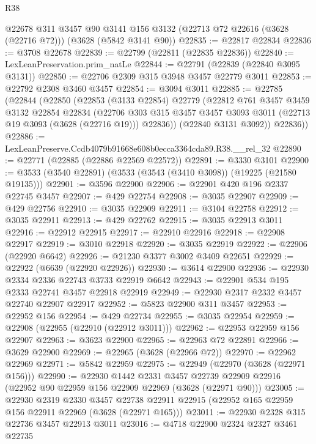 \begin{lexlean}{R38}
\begin{coremodule}
    @22678
    @311
    @3457
    @90
    @3141
    @156
    @3132
    (@22713 @72 @22616 (@3628 (@22716 @72)))
    (@3628 (@5842 @3141 @90))
@22835 := @22817 @22834
@22836 := @3708 @22678
@22839 := @22799 (@22811 (@22835 @22836))
@22840 := LexLeanPreservation.prim_natLe
@22844 := @22791 (@22839 (@22840 @3095 @3131))
@22850 := @22706 @2309 @315 @3948 @3457 @22779 @3011
@22853 := @22792 @2308 @3460 @3457
@22854 := @3094 @3011
@22885 := @22785
    (@22844
      (@22850
        (@22853
          (@3133 @22854)
          @22779
          (@22812
            @761
            @3457
            @3459
            @3132
            @22854
            @22834
            (@22706
              @303
              @315
              @3457
              @3457
              @3093
              @3011
              (@22713 @19 @3093 (@3628 (@22716 @19)))
              @22836))
          (@22840 @3131 @3092))
        @22836))
@22886 := LexLeanPreserve.Ccdb4079b91668e608b0ecca3364cda89.R38.__rel_32
@22890 := @22771 (@22885 (@22886 @22569 @22572))
@22891 := @3330 @3101
@22900 := @3533 (@3540 @22891) (@3533 (@3543 (@3410 @3098)) (@19225 (@21580 @19135)))
@22901 := @3596 @22900
@22906 := @22901 @420 @196 @2337 @22745 @3457
@22907 := @429 @22754
@22908 := @3035 @22907
@22909 := @429 @22756
@22910 := @3035 @22909
@22911 := @3104 @22758
@22912 := @3035 @22911
@22913 := @429 @22762
@22915 := @3035 @22913 @3011
@22916 := @22912 @22915
@22917 := @22910 @22916
@22918 := @22908 @22917
@22919 := @3010 @22918
@22920 := @3035 @22919
@22922 := @22906 (@22920 @6642)
@22926 := @21230 @3377 @3002 @3409 @22651
@22929 := @22922 (@6639 (@22920 @22926))
@22930 := @3614 @22900
@22936 := @22930 @2334 @2336 @22743 @3733 @22919 @6642
@22943 := @22901 @534 @195 @2333 @22741 @3457 @22918 @22919
@22949 := @22930 @2317 @2332 @3457 @22740 @22907 @22917
@22952 := @5823 @22900 @311 @3457
@22953 := @22952 @156
@22954 := @429 @22734
@22955 := @3035 @22954
@22959 := @22908 (@22955 (@22910 (@22912 @3011)))
@22962 := @22953 @22959 @156 @22907
@22963 := @3623 @22900
@22965 := @22963 @72 @22891
@22966 := @3629 @22900
@22969 := @22965 (@3628 (@22966 @72))
@22970 := @22962 @22969
@22971 := @5842 @22959
@22975 := @22949 (@22970 (@3628 (@22971 @156)))
@22990 := @22930
    @1442
    @2331
    @3457
    @22739
    @22909
    @22916
    (@22952 @90 @22959 @156 @22909 @22969 (@3628 (@22971 @90)))
@23005 := @22930
    @2319
    @2330
    @3457
    @22738
    @22911
    @22915
    (@22952 @165 @22959 @156 @22911 @22969 (@3628 (@22971 @165)))
@23011 := @22930 @2328 @315 @22736 @3457 @22913 @3011
@23016 := @4718 @22900 @2324 @2327 @3461 @22735

\end{coremodule}
\end{lexlean}
